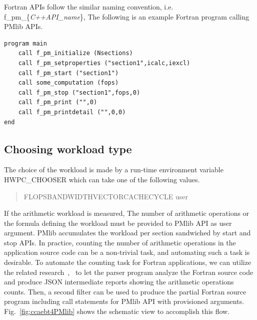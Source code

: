 \documentclass[conference]{IEEEtran}
\begin{document}
Fortran APIs follow the similar naming convention,
i.e. f\_pm\_\{{\footnotesize\it{C++API\_name}}\},
The following is an example Fortran program calling PMlib APIs.

\begin{lstlisting}
program main
	call f_pm_initialize (Nsections)
	call f_pm_setproperties ("section1",icalc,iexcl)
	call f_pm_start ("section1")
	call some_computation (fops)
	call f_pm_stop ("section1",fops,0)
	call f_pm_print ("",0)
	call f_pm_printdetail ("",0,0)
end
\end{lstlisting}

%
\subsection{Choosing workload type}
\label{subsection:Choosing-workload-type}

The choice of the workload is made by a
run-time environment variable HWPC\_CHOOSER
which can take one of the following values.
\begin{quote}
\begin{small}
FLOPS\textbar BANDWIDTH\textbar VECTOR\textbar CACHE\textbar CYCLE%
\textbar user
\end{small}
\end{quote}

If the arithmetic workload is measured,
The number of arithmetic operations or the formula defining the workload
must be provided to PMlib API as user argument.
PMlib accumulates the workload per section sandwiched by start and stop APIs.
In practice, counting the number of arithmetic operations in the application
source code can be a non-trivial task, and automating such a task is desirable.
%
To automate the counting task for Fortran applications, we can utilize
the related research~\cite{Hoshimoto:2015},~\cite{ccaebt:HPCAsia2018}
to let the parser program analyze the Fortran source code
and produce JSON intermediate reports showing the arithmetic operations counts.
Then, a second filter can be used to produce the partial Fortran source program
including call statements for PMlib API with provisioned arguments.
Fig.~\ref{fig:ccaebt4PMlib} shows the schematic view to accomplish this flow.
\end{document}
